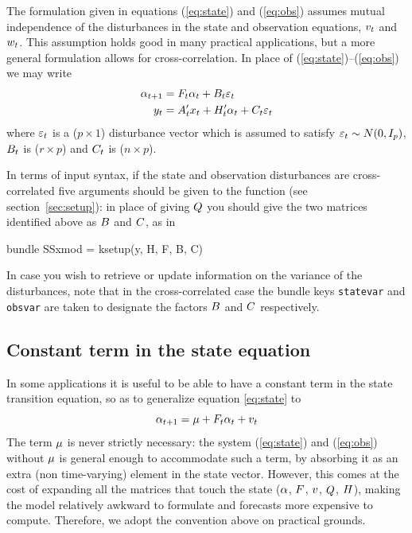 \documentclass[a4paper]{article}
\begin{document}
The formulation given in equations (\ref{eq:state}) and (\ref{eq:obs})
assumes mutual independence of the disturbances in the state and
observation equations, $v_t$ and $w_t$.  This assumption
holds good in many practical applications, but a more general
formulation allows for cross-correlation.  In place of
(\ref{eq:state})--(\ref{eq:obs}) we may write
%
\begin{align*}
  \alpha_{t+1} &= F_t \alpha_t + 
     B_t \varepsilon_t \\
  y_t &= A_t'x_t + H_t' \alpha_t + 
     C_t \varepsilon_t 
\end{align*}
%
where $\varepsilon_t$ is a ($p \times 1$) disturbance vector which is
assumed to satisfy $\varepsilon_t \sim N(0, I_p)$, $B_t$ is
($r \times p$) and $C_t$ is ($n \times p$).

In terms of input syntax, if the state and observation disturbances
are cross-correlated five arguments should be given to the
 function (see section~\ref{sec:setup}): in place of
giving $Q$ you should give the two matrices identified above as
$B$ and $C$, as in
\begin{code}
bundle SSxmod = ksetup(y, H, F, B, C)
\end{code}

In case you wish to retrieve or update information on the variance of
the disturbances, note that in the cross-correlated case the bundle
keys \texttt{statevar} and \texttt{obsvar} are taken to designate the
factors $B$ and $C$ respectively.

\subsection{Constant term in the state equation}
\label{sec:stconst}

In some applications it is useful to be able to have a
constant term in the state transition equation, so as to generalize
equation \eqref{eq:state} to 
\[
  \alpha_{t+1} = \mu + F_t \alpha_t + v_t \\
\]
The term $\mu$ is never strictly necessary: the system
(\ref{eq:state}) and (\ref{eq:obs}) without $\mu$ is general
enough to accommodate such a term, by absorbing it as an extra (non
time-varying) element in the state vector.  However, this comes at the
cost of expanding all the matrices that touch the state ($\alpha$,
$F$, $v$, $Q$, $H$), making the model
relatively awkward to formulate and forecasts more expensive to
compute. Therefore, we adopt the convention above on practical
grounds.
\end{document}
